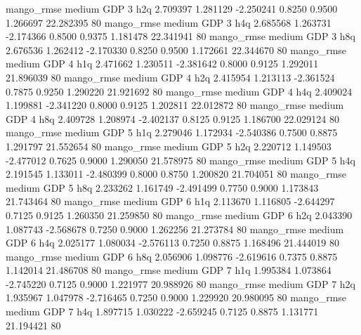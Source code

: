        mango_rmse     medium      GDP                 3                  h2q  2.709397 1.281129 -2.250241 0.8250 0.9500  1.266697   22.282395 80
       mango_rmse     medium      GDP                 3                  h4q  2.685568 1.263731 -2.174366 0.8500 0.9375  1.181478   22.341941 80
       mango_rmse     medium      GDP                 3                  h8q  2.676536 1.262412 -2.170330 0.8250 0.9500  1.172661   22.344670 80
       mango_rmse     medium      GDP                 4                  h1q  2.471662 1.230511 -2.381642 0.8000 0.9125  1.292011   21.896039 80
       mango_rmse     medium      GDP                 4                  h2q  2.415954 1.213113 -2.361524 0.7875 0.9250  1.290220   21.921692 80
       mango_rmse     medium      GDP                 4                  h4q  2.409024 1.199881 -2.341220 0.8000 0.9125  1.202811   22.012872 80
       mango_rmse     medium      GDP                 4                  h8q  2.409728 1.208974 -2.402137 0.8125 0.9125  1.186700   22.029124 80
       mango_rmse     medium      GDP                 5                  h1q  2.279046 1.172934 -2.540386 0.7500 0.8875  1.291797   21.552654 80
       mango_rmse     medium      GDP                 5                  h2q  2.220712 1.149503 -2.477012 0.7625 0.9000  1.290050   21.578975 80
       mango_rmse     medium      GDP                 5                  h4q  2.191545 1.133011 -2.480399 0.8000 0.8750  1.200820   21.704051 80
       mango_rmse     medium      GDP                 5                  h8q  2.233262 1.161749 -2.491499 0.7750 0.9000  1.173843   21.743464 80
       mango_rmse     medium      GDP                 6                  h1q  2.113670 1.116805 -2.644297 0.7125 0.9125  1.260350   21.259850 80
       mango_rmse     medium      GDP                 6                  h2q  2.043390 1.087743 -2.568678 0.7250 0.9000  1.262256   21.273784 80
       mango_rmse     medium      GDP                 6                  h4q  2.025177 1.080034 -2.576113 0.7250 0.8875  1.168496   21.444019 80
       mango_rmse     medium      GDP                 6                  h8q  2.056906 1.098776 -2.619616 0.7375 0.8875  1.142014   21.486708 80
       mango_rmse     medium      GDP                 7                  h1q  1.995384 1.073864 -2.745220 0.7125 0.9000  1.221977   20.988926 80
       mango_rmse     medium      GDP                 7                  h2q  1.935967 1.047978 -2.716465 0.7250 0.9000  1.229920   20.980095 80
       mango_rmse     medium      GDP                 7                  h4q  1.897715 1.030222 -2.659245 0.7125 0.8875  1.131771   21.194421 80
